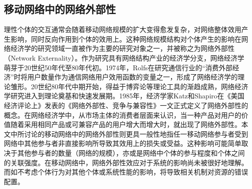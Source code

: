 \subsection{移动网络中的网络外部性}
理性个体的交互通常会随着移动网络规模的扩大变得愈发复杂，对网络整体效用产生影响，同时反向作用到个体的效用上。这种网络规模结构对个体产生的影响在网络经济学的研究领域一直被作为主要的研究对象之一，并被称之为{\kaishu 网络外部性（Network Externality）}。作为研究具有网络结构产业的经济学分支，网络经济学萌芽于20世纪50年代至80年代初。1974年，Rolfs\cite{Rolfs}在研究通信行业的“消费外部经济”时将用户数量作为通信网络用户效用函数的变量之一，形成了网络经济学的理论雏形。20世纪80年代中期开始，得益于博弈论等理论工具的渐趋成熟，网络经济学研究进入到理论奠基和快速发展期。1985年，经济学家Katz和Shapiro在《美国经济评论上》发表的《网络外部性、竞争与兼容性》一文\cite{Katz}正式定义了网络外部性的概念。在网络经济学中，从市场主体的消费者层面来认识，当一种产品对用户的价值随着采用相同产品或可兼容产品的用户增大而增大时，就出现了网络外部性。本文中所讨论的移动网络中的网络外部性则更具一般性地指任一移动网络参与者受到网络中其他参与者非直接影响所导致其效用上的损失或受益。这种影响可能简单取决于其他参与者的数量（网络的规模），亦或是网络中个体的参与程度和个体之间的关联强度\cite{externality}。在移动网络中，网络外部性效应对于系统的影响尚未被很好地理解。而如不考虑个体行为对其他个体或系统性能的影响，将导致相关机制对资源的错误配置。




